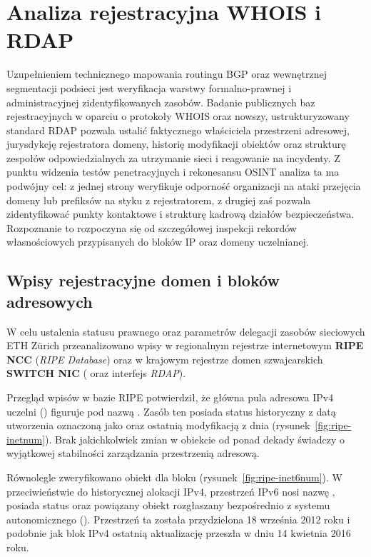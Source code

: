 \section{Analiza rejestracyjna WHOIS i RDAP}\label{sec:whois-rdap}

Uzupełnieniem technicznego mapowania routingu BGP oraz wewnętrznej segmentacji podsieci jest weryfikacja warstwy formalno-prawnej i administracyjnej zidentyfikowanych zasobów. Badanie publicznych baz rejestracyjnych w oparciu o protokoły WHOIS oraz nowszy, ustrukturyzowany standard RDAP pozwala ustalić faktycznego właściciela przestrzeni adresowej, jurysdykcję rejestratora domeny, historię modyfikacji obiektów oraz strukturę zespołów odpowiedzialnych za utrzymanie sieci i reagowanie na incydenty. Z punktu widzenia testów penetracyjnych i rekonesansu OSINT analiza ta ma podwójny cel: z jednej strony weryfikuje odporność organizacji na ataki przejęcia domeny lub prefiksów na styku z rejestratorem, z drugiej zaś pozwala zidentyfikować punkty kontaktowe i strukturę kadrową działów bezpieczeństwa. Rozpoznanie to rozpoczyna się od szczegółowej inspekcji rekordów własnościowych przypisanych do bloków IP oraz domeny uczelnianej.

\subsection{Wpisy rejestracyjne domen i bloków adresowych}\label{subsec:whois-domeny-ip}

W celu ustalenia statusu prawnego oraz parametrów delegacji zasobów sieciowych ETH Zürich przeanalizowano wpisy w regionalnym rejestrze internetowym \textbf{RIPE NCC} (\textit{RIPE Database}) oraz w krajowym rejestrze domen szwajcarskich \textbf{SWITCH NIC} ( oraz interfejs \textit{RDAP}).


Przegląd wpisów w bazie RIPE potwierdził, że główna pula adresowa IPv4 uczelni () figuruje pod nazwą . Zasób ten posiada status historyczny  z datą utworzenia oznaczoną jako  oraz ostatnią modyfikacją z dnia  (rysunek~\ref{fig:ripe-inetnum}). Brak jakichkolwiek zmian w obiekcie od ponad dekady świadczy o wyjątkowej stabilności zarządzania przestrzenią adresową.

Równolegle zweryfikowano obiekt  dla bloku  (rysunek~\ref{fig:ripe-inet6num}). W przeciwieństwie do historycznej alokacji IPv4, przestrzeń IPv6 nosi nazwę , posiada status  oraz powiązany obiekt  rozgłaszany bezpośrednio z systemu autonomicznego  (). Przestrzeń ta została przydzielona 18 września 2012 roku i podobnie jak blok IPv4 ostatnią aktualizację przeszła w dniu 14 kwietnia 2016 roku.


